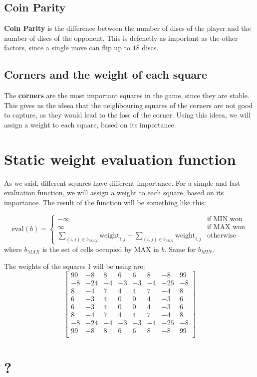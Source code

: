\documentclass{article}
\begin{document}
\subsection*{Coin Parity}
\quad \textbf{Coin Parity} is the difference between the number of discs of the player and the number of discs of the opponent.
This is defenetly as important as the other factors, since a single move can flip up to $18$ discs.

\subsection*{Corners and the weight of each square}
\quad The \textbf{corners} are the most important squares in the game, since they are stable. 
This gives us the ideea that the neighbouring squares of the corners are not good to capture, as they would lead to the loss of the corner.
Using this ideea, we will assign a weight to each square, based on its importance.

\section*{Static weight evaluation function}
\quad As we said, different squares have different importance. 
For a simple and fast evaluation function, we will assign a weight to each square, based on its importance.
The result of the function will be something like this:

\[
  \text{eval}(b) = 
  \begin{cases}
    -\infty & \text{if MIN won} \\
    \infty & \text{if MAX won} \\
    \sum_{(i,j) \in b_{MAX}} \text{weight}_{i,j} - \sum_{(i,j) \in b_{MIN}} \text{weight}_{i,j} & \text{otherwise}
  \end{cases}
\]
where $b_{MAX}$ is the set of cells occupied by MAX in $b$. Same for $b_{MIN}$.

The weights of the squares I will be using are:
\[
  \begin{bmatrix}
    99 & -8 & 8 & 6 & 6 & 8 & -8 & 99 \\
    -8 & -24 & -4 & -3 & -3 & -4 & -25 & -8 \\
    8 & -4 & 7 & 4 & 4 & 7 & -4 & 8 \\
    6 & -3 & 4 & 0 & 0 & 4 & -3 & 6 \\
    6 & -3 & 4 & 0 & 0 & 4 & -3 & 6 \\
    8 & -4 & 7 & 4 & 4 & 7 & -4 & 8 \\
    -8 & -24 & -4 & -3 & -3 & -4 & -25 & -8 \\
    99 & -8 & 8 & 6 & 6 & 8 & -8 & 99 \\
  \end{bmatrix}
\]

\section*{?}
\end{document}
